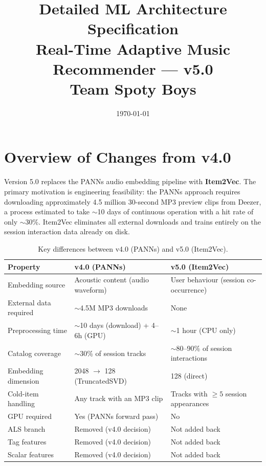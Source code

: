 \documentclass[11pt]{article}
\title{%
  Detailed ML Architecture Specification\\[4pt]
  \large Real-Time Adaptive Music Recommender --- v5.0\\[2pt]
  \normalsize Team Spoty Boys}
\author{}
\date{\today}
\begin{document}
\maketitle
\tableofcontents
\newpage

\section{Overview of Changes from v4.0}

Version 5.0 replaces the PANNs audio embedding pipeline with
\textbf{Item2Vec}. The primary motivation is engineering feasibility:
the PANNs approach requires downloading approximately 4.5 million
30-second MP3 preview clips from Deezer, a process estimated to take
$\sim$10 days of continuous operation with a hit rate of only $\sim$30\%.
Item2Vec eliminates all external downloads and trains entirely on
the session interaction data already on disk.

\begin{table}[H]
\centering
\caption{Key differences between v4.0 (PANNs) and v5.0 (Item2Vec).}
\label{tab:version_diff}
\begin{tabular}{lll}
\toprule
\textbf{Property} & \textbf{v4.0 (PANNs)} & \textbf{v5.0 (Item2Vec)} \\
\midrule
Embedding source & Acoustic content (audio waveform) & User behaviour (session co-occurrence) \\
External data required & $\sim$4.5M MP3 downloads & None \\
Preprocessing time & $\sim$10 days (download) + 4--6h (GPU) & $\sim$1 hour (CPU only) \\
Catalog coverage & $\sim$30\% of session tracks & $\sim$80--90\% of session interactions \\
Embedding dimension & 2048 $\to$ 128 (TruncatedSVD) & 128 (direct) \\
Cold-item handling & Any track with an MP3 clip & Tracks with $\ge 5$ session appearances \\
GPU required & Yes (PANNs forward pass) & No \\
\midrule
ALS branch & Removed (v4.0 decision) & Not added back \\
Tag features & Removed (v4.0 decision) & Not added back \\
Scalar features & Removed (v4.0 decision) & Not added back \\
\bottomrule
\end{tabular}
\end{table}
\end{document}
